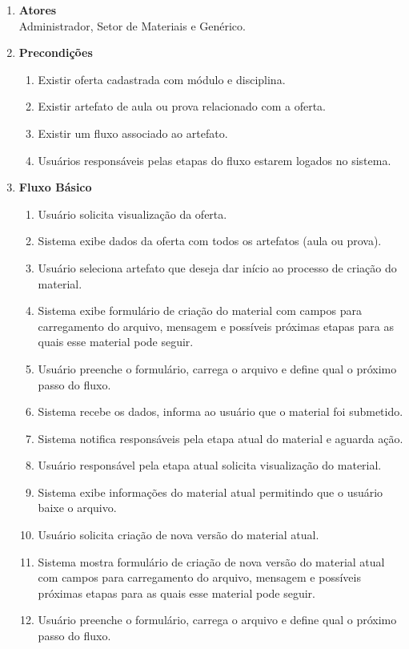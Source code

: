 \begin{enumerate}[label=\textbf{UC03}, leftmargin=2cm]
	\begin{enumerate}[label=, leftmargin=0cm]
		\item \textbf{Atores} \\
		Administrador, Setor de Materiais e Genérico.
		\item \textbf{Precondições}
			\begin{enumerate}[label=\arabic*.]
				\item Existir oferta cadastrada com módulo e disciplina.
				\item Existir artefato de aula ou prova relacionado com a oferta.
				\item Existir um fluxo associado ao artefato.
				\item Usuários responsáveis pelas etapas do fluxo estarem logados no sistema.
			\end{enumerate}
		\item \textbf{Fluxo Básico}
			\begin{enumerate}[label=\arabic*.]
				\item Usuário solicita visualização da oferta.
				\item Sistema exibe dados da oferta com todos os artefatos (aula ou prova).
				\item Usuário seleciona artefato que deseja dar início ao processo de criação do material.
				\item Sistema exibe formulário de criação do material com campos para carregamento do arquivo, mensagem e possíveis próximas etapas para as quais esse material pode seguir.
				\item Usuário preenche o formulário, carrega o arquivo e define qual o próximo passo do fluxo.
				\item Sistema recebe os dados, informa ao usuário que o material foi submetido.
				\item Sistema notifica responsáveis pela etapa atual do material e aguarda ação.
				\item Usuário responsável pela etapa atual solicita visualização do material.
				\item Sistema exibe informações do material atual permitindo que o usuário baixe o arquivo.
				\item Usuário solicita criação de nova versão do material atual.
				\item Sistema mostra formulário de criação de nova versão do material atual com campos para carregamento do arquivo, mensagem e possíveis próximas etapas para as quais esse material pode seguir.
				\item Usuário preenche o formulário, carrega o arquivo e define qual o próximo passo do fluxo.

\end{enumerate}
\end{enumerate}
\end{enumerate}
